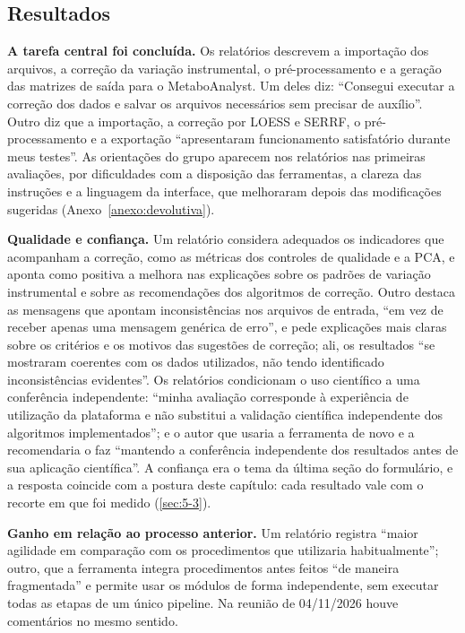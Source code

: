\subsection{Resultados}\label{sec:5-4-4}

\textbf{A tarefa central foi concluída.} Os relatórios descrevem a importação dos arquivos, a correção da variação instrumental, o pré-processamento e a geração das matrizes de saída para o MetaboAnalyst. Um deles diz: ``Consegui executar a correção dos dados e salvar os arquivos necessários sem precisar de auxílio''. Outro diz que a importação, a correção por LOESS e SERRF, o pré-processamento e a exportação ``apresentaram funcionamento satisfatório durante meus testes''. As orientações do grupo aparecem nos relatórios nas primeiras avaliações, por dificuldades com a disposição das ferramentas, a clareza das instruções e a linguagem da interface, que melhoraram depois das modificações sugeridas (Anexo~\ref{anexo:devolutiva}).

\textbf{Qualidade e confiança.} Um relatório considera adequados os indicadores que acompanham a correção, como as métricas dos controles de qualidade e a PCA, e aponta como positiva a melhora nas explicações sobre os padrões de variação instrumental e sobre as recomendações dos algoritmos de correção. Outro destaca as mensagens que apontam inconsistências nos arquivos de entrada, ``em vez de receber apenas uma mensagem genérica de erro'', e pede explicações mais claras sobre os critérios e os motivos das sugestões de correção; ali, os resultados ``se mostraram coerentes com os dados utilizados, não tendo identificado inconsistências evidentes''. Os relatórios condicionam o uso científico a uma conferência independente: ``minha avaliação corresponde à experiência de utilização da plataforma e não substitui a validação científica independente dos algoritmos implementados''; e o autor que usaria a ferramenta de novo e a recomendaria o faz ``mantendo a conferência independente dos resultados antes de sua aplicação científica''. A confiança era o tema da última seção do formulário, e a resposta coincide com a postura deste capítulo: cada resultado vale com o recorte em que foi medido (\ref{sec:5-3}).

\textbf{Ganho em relação ao processo anterior.} Um relatório registra ``maior agilidade em comparação com os procedimentos que utilizaria habitualmente''; outro, que a ferramenta integra procedimentos antes feitos ``de maneira fragmentada'' e permite usar os módulos de forma independente, sem executar todas as etapas de um único pipeline. Na reunião de 04/11/2026 houve comentários no mesmo sentido.

